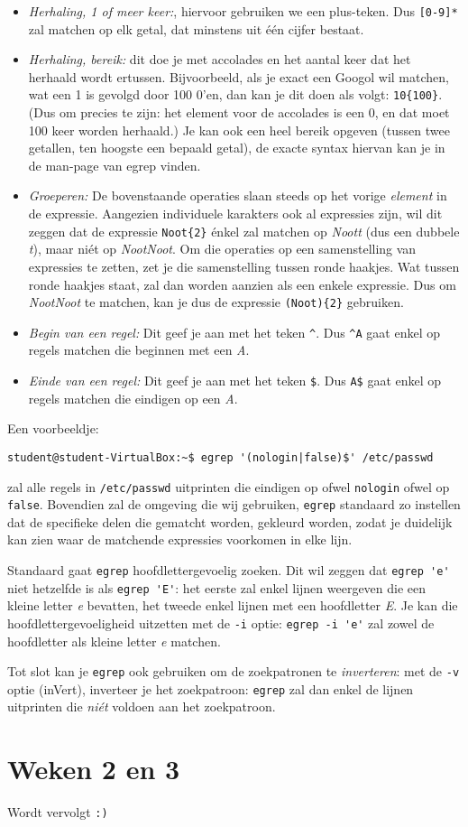 \documentclass[a4paper,twoside,openany]{memoir}
\begin{document}
\begin{itemize}
\item \emph{Herhaling, 1 of meer keer:}, hiervoor gebruiken we een plus-teken. Dus \verb![0-9]*! zal matchen op elk getal, dat minstens uit \'e\'en cijfer bestaat.
\item \emph{Herhaling, bereik:} dit doe je met accolades en het aantal keer dat het herhaald wordt ertussen. Bijvoorbeeld, als je exact een Googol wil matchen, wat een 1 is gevolgd door 100 0'en, dan kan je dit doen als volgt: \verb!10{100}!. (Dus om precies te zijn: het element voor de accolades is een 0, en dat moet 100 keer worden herhaald.) Je kan ook een heel bereik opgeven (tussen twee getallen, ten hoogste een bepaald getal), de exacte syntax hiervan kan je in de man-page van egrep vinden.
\item \emph{Groeperen:} De bovenstaande operaties slaan steeds op het vorige \emph{element} in de expressie. Aangezien individuele karakters ook al expressies zijn, wil dit zeggen dat de expressie \verb!Noot{2}! \'enkel zal matchen op \emph{Noott} (dus een dubbele \emph{t}), maar ni\'et op \emph{NootNoot}. Om die operaties op een samenstelling van expressies te zetten, zet je die samenstelling tussen ronde haakjes. Wat tussen ronde haakjes staat, zal dan worden aanzien als een enkele expressie. Dus om \emph{NootNoot} te matchen, kan je dus de expressie \verb!(Noot){2}! gebruiken.
\item \emph{Begin van een regel:} Dit geef je aan met het teken \verb!^!. Dus \verb!^A! gaat enkel op regels matchen die beginnen met een \emph{A}.
\item \emph{Einde van een regel:} Dit geef je aan met het teken \verb!$!. Dus \verb!A$! gaat enkel op regels matchen die eindigen op een \emph{A}.
\end{itemize}

Een voorbeeldje:

\begin{verbatim}
student@student-VirtualBox:~$ egrep '(nologin|false)$' /etc/passwd
\end{verbatim}

zal alle regels in \verb!/etc/passwd! uitprinten die eindigen op ofwel \verb!nologin! ofwel op \verb!false!. Bovendien zal de omgeving die wij gebruiken, \verb!egrep! standaard zo instellen dat de specifieke delen die gematcht worden, gekleurd worden, zodat je duidelijk kan zien waar de matchende expressies voorkomen in elke lijn.

Standaard gaat \verb!egrep! hoofdlettergevoelig zoeken. Dit wil zeggen dat \verb!egrep 'e'! niet hetzelfde is als \verb!egrep 'E'!: het eerste zal enkel lijnen weergeven die een kleine letter \emph{e} bevatten, het tweede enkel lijnen met een hoofdletter \emph{E}. Je kan die hoofdlettergevoeligheid uitzetten met de \verb!-i! optie: \verb!egrep -i 'e'! zal zowel de hoofdletter als kleine letter \emph{e} matchen.

Tot slot kan je \verb!egrep! ook gebruiken om de zoekpatronen te \emph{inverteren}: met de \verb!-v! optie (inVert), inverteer je het zoekpatroon: \verb!egrep! zal dan enkel de lijnen uitprinten die \emph{ni\'et} voldoen aan het zoekpatroon.

\part{Weken 2 en 3}
Wordt vervolgt \verb!:)!
\end{document}
